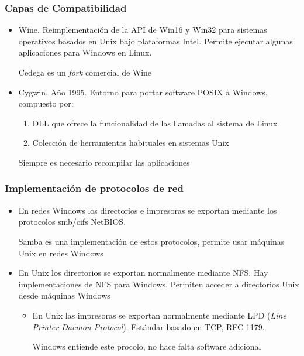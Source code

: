 \documentclass[ucs]{beamer}
\begin{document}

\begin{frame}[fragile]
\frametitle{Capas de Compatibilidad}

 \begin{itemize}
 \item
 Wine. Reimplementación de la API de Win16 y Win32 para sistemas 
 operativos basados en Unix bajo plataformas Intel. Permite
 ejecutar algunas aplicaciones para Windows en Linux. 

Cedega es un \emph{fork} comercial de Wine
 \item
 Cygwin. Año 1995.
 Entorno para portar software POSIX a Windows, compuesto por:
  \begin{enumerate}
  \item
  DLL que ofrece la funcionalidad de las llamadas al sistema de Linux
  \item
  Colección de herramientas habituales en sistemas Unix
  \end{enumerate}
  Siempre es necesario recompilar las aplicaciones 
\end{itemize}

\end{frame}

\begin{frame}[fragile]

\frametitle{Implementación de protocolos de red}

\begin{itemize}
\item
En redes Windows los directorios e impresoras se exportan mediante
los protocolos smb/cifs NetBIOS.

Samba es una implementación de estos protocolos,
permite
usar máquinas Unix en redes Windows 
\item
En Unix los directorios se exportan normalmente mediante NFS.
Hay implementaciones de NFS para Windows.  Permiten
acceder a directorios Unix desde máquinas Windows
\begin{itemize}
\item
En Unix las impresoras se exportan normalmente mediante LPD (\emph{Line Printer Daemon Protocol}).
Estándar basado en TCP, RFC 1179. 

Windows entiende este procolo, no hace falta software adicional
\end{itemize}
\end{itemize}
\end{frame}
\end{document}
